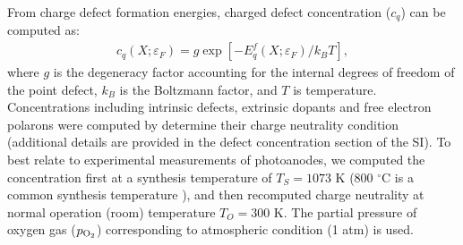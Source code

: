 From charge defect formation energies, charged defect concentration ($c_q$) can be computed as:
\begin{align}
    c_q(X; \varepsilon_F) = g \exp [- E^f_q(X; \varepsilon_F) / k_B T],
\end{align}
where $g$ is the degeneracy factor accounting for the internal degrees of freedom of the point defect, $k_B$ is the Boltzmann factor, and $T$ is temperature.
Concentrations including intrinsic defects, extrinsic dopants and free electron polarons were computed by determine their charge neutrality condition~\cite{fe2o3concentration,lee2013thermodynamics,freysoldt2014first}
(additional details are provided in the defect concentration section of the SI).
To best relate to experimental measurements of  photoanodes, we computed the concentration first at a synthesis temperature of $T_S=1073$ K (800 $^\circ$C is a common synthesis temperature \cite{ling2011sn,tian2020electronic}), and then recomputed charge neutrality at normal operation (room) temperature $T_O=300$ K.
The partial pressure of oxygen gas ($p_{\rm O_2}$) corresponding to atmospheric condition (1 atm) is used.




